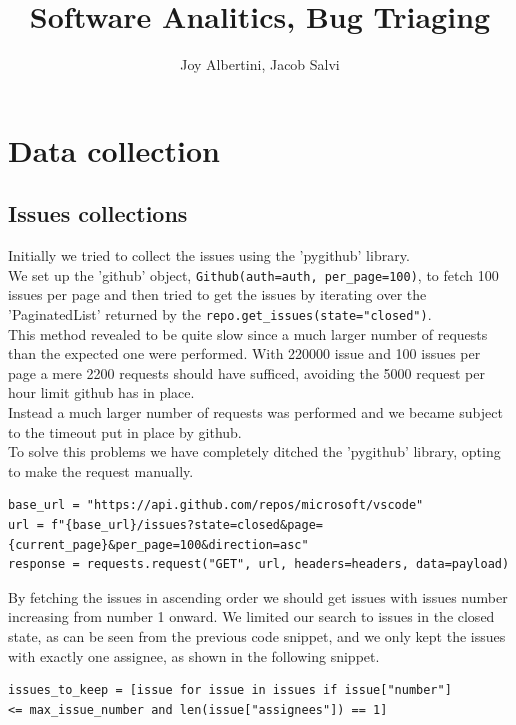\documentclass[tikz,10pt,fleqn]{article}
\title{Software Analitics, Bug Triaging}
\author{Joy Albertini, Jacob Salvi}
\date{}
\begin{document}
\maketitle

\section*{Data collection}
\subsection*{Issues collections}
Initially we tried to collect the issues using the 'pygithub' library.\\
We set up the 'github' object, \texttt{Github(auth=auth, per_page=100)}, to fetch 100 issues per page and then tried to get the issues by iterating over the 'PaginatedList' returned by the \texttt{repo.get_issues(state="closed")}.\\
This method revealed to be quite slow since a much larger number of requests than the expected one were performed. With 220000 issue and 100 issues per page a mere 2200 requests should have sufficed, avoiding the 5000 request per hour limit github has in place.\\
Instead a much larger number of requests was performed and we became subject to the timeout put in place by github. \\
To solve this problems we have completely ditched the 'pygithub' library, opting to make the request manually.

\begin{verbatim}
base_url = "https://api.github.com/repos/microsoft/vscode"
url = f"{base_url}/issues?state=closed&page={current_page}&per_page=100&direction=asc"
response = requests.request("GET", url, headers=headers, data=payload)
\end{verbatim}

By fetching the issues in ascending order we should get issues with issues number increasing from number 1 onward. We limited our search to issues in the closed state, as can be seen from the previous code snippet, and we only kept the issues with exactly one assignee, as shown in the following snippet.\\
\begin{verbatim}
issues_to_keep = [issue for issue in issues if issue["number"] 
<= max_issue_number and len(issue["assignees"]) == 1]
\end{verbatim}
\end{document}
